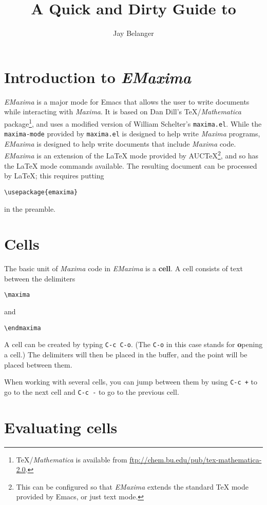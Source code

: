 \documentclass{article}
\title{A Quick and Dirty Guide to \emx{}}
\author{Jay Belanger}
\date{}
\newcommand{\emx}{\textsl{\sffamily EMaxima}}
\newcommand{\mx}{\textsl{\sffamily Maxima}}
\begin{document}
\maketitle

\section{Introduction to \emx}

\emx{} is a major mode for Emacs that allows the user to write documents
while interacting with \mx.  It is based on Dan Dill's
\TeX{}/\textit{Mathematica} package\footnote{\TeX/\textit{Mathematica} is
available from \url{ftp://chem.bu.edu/pub/tex-mathematica-2.0}.}, and
uses a modified version of William Schelter's
\texttt{maxima.el}.
While the \texttt{maxima-mode} provided by \texttt{maxima.el} is designed
to help write \mx{} programs, \emx{} is designed to help write
documents that include \mx{} code.  \emx{} is an extension of the
\LaTeX{} mode provided by AUC\TeX{}\footnote{This can be configured so
that \emx{} extends the standard \TeX{} mode provided by Emacs, or just
text mode.}, and so has the \LaTeX{} mode commands available.  The
resulting document can be processed by \LaTeX{}; this requires putting 
\begin{verbatim}
\usepackage{emaxima}
\end{verbatim}
\noindent
in the preamble.

\section{Cells}

The basic unit of \mx{} code in \emx{} is a \textbf{cell}.  A cell
consists of text between the delimiters
\begin{verbatim}
\maxima
\end{verbatim}
\noindent
and
\begin{verbatim}
\endmaxima
\end{verbatim}
\noindent
A cell can be created by typing \texttt{C-c C-o}.  (The \texttt{C-o} in this
case stands for \textbf{o}pening a cell.)  The delimiters will then be
placed in the buffer, and the point will be placed between them.

When working with several cells, you can jump between them by using
\texttt{C-c +} to go to the next cell and \texttt{C-c -} to go to the
previous cell.

\section{Evaluating cells}
\end{document}
